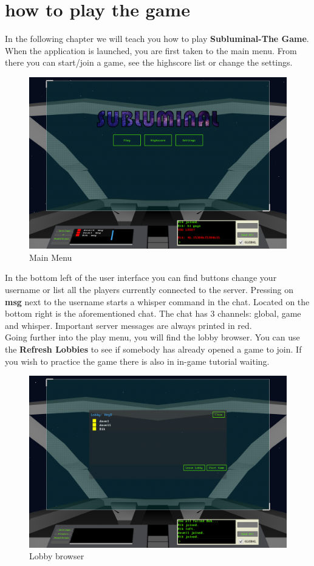 ﻿\chapter*{how to play the game}
In the following chapter we will teach you how to play \textbf{Subluminal-The Game}. When the application is launched, you are first taken to the main menu. From there you can start/join a game, see the highscore list or change the settings.

\begin{figure}[!htb]
	\centering
	\includegraphics[width=.85\textwidth]{chapters/gamerules/menu.png}
	\caption*{Main Menu}
\end{figure}

\noindent In the bottom left of the user interface you can find buttons change your username or list all the players currently connected to the server. Pressing on \textbf{msg} next to the username starts a whisper command in the chat. Located on the bottom right is the aforementioned chat. The chat has 3 channels: global, game and whisper. Important server messages are always printed in red.\\

\noindent Going further into the play menu, you will find the lobby browser. You can use the \textbf{Refresh Lobbies} to see if somebody has already opened a game to join. If you wish to practice the game there is also in in-game tutorial waiting.

\begin{figure}[!htb]
	\centering
	\includegraphics[width=.85\textwidth]{chapters/gamerules/lobby.png}
	\caption*{Lobby browser}
\end{figure}

